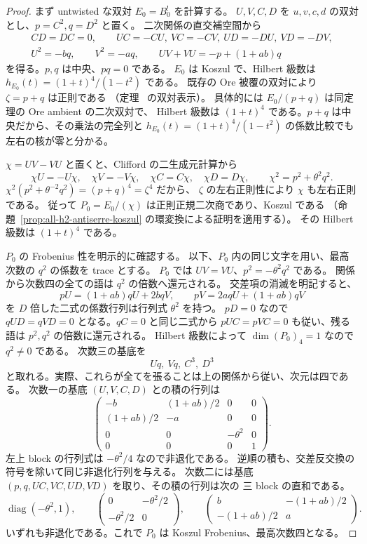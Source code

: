 \begin{proof}
まず untwisted な双対 \(E_0=B_0^!\) を計算する。
\(U,V,C,D\) を \(u,v,c,d\) の双対とし、\(p=C^2,q=D^2\) と置く。
二次関係の直交補空間から
\begin{gather*}
 CD=DC=0,\qquad
 UC=-CU,\ VC=-CV,\ UD=-DU,\ VD=-DV,\\
 U^2=-bq,\qquad V^2=-aq,\qquad
 UV+VU=-p+(1+ab)q
\end{gather*}
を得る。\(p,q\) は中央、\(pq=0\) である。
\(E_0\) は Koszul で、Hilbert 級数は
\(h_{E_0}(t)=(1+t)^4/(1-t^2)\) である。
既存の Ore 被覆の双対により \(\zeta=p+q\) は正則である
（定理~\cite[\texttt{thm:ore-anticommuting-central}]{QuadricIntrinsic2026} の双対表示）。
具体的には $E_0/(p+q)$ は同定理の Ore ambient の二次双対で、
Hilbert 級数は $(1+t)^4$ である。$p+q$ は中央だから、その乗法の完全列と
$h_{E_0}(t)=(1+t)^4/(1-t^2)$ の係数比較でも左右の核が零と分かる。

\(\chi=UV-VU\) と置くと、Clifford の二生成元計算から
\[
 \chi U=-U\chi,\quad \chi V=-V\chi,\quad
 \chi C=C\chi,\quad \chi D=D\chi,\qquad
 \chi^2=p^2+\theta^2q^2.
\]
\(\chi^2(p^2+\theta^{-2}q^2)=(p+q)^4=\zeta^4\) だから、
\(\zeta\) の左右正則性により \(\chi\) も左右正則である。
従って \(P_0=E_0/(\chi)\) は正則正規二次商であり、Koszul である
（命題~\ref{prop:all-h2-antiserre-koszul} の環変換による証明を適用する）。
その Hilbert 級数は \((1+t)^4\) である。

\(P_0\) の Frobenius 性を明示的に確認する。
以下、\(P_0\) 内の同じ文字を用い、最高次数の \(q^2\) の係数を trace とする。
\(P_0\) では \(UV=VU\)、\(p^2=-\theta^2q^2\) である。
関係から次数四の全ての語は \(q^2\) の倍数へ還元される。
交差項の消滅を明記すると、
\[
 pU=(1+ab)qU+2bqV,\qquad pV=2aqU+(1+ab)qV
\]
を $D$ 倍した二式の係数行列は行列式 $\theta^2$ を持つ。
$pD=0$ なので $qUD=qVD=0$ となる。$qC=0$ と同じ二式から
$pUC=pVC=0$ も従い、残る語は $p^2,q^2$ の倍数に還元される。
Hilbert 級数によって \(\dim(P_0)_4=1\) なので \(q^2\ne0\) である。
次数三の基底を
\[
 Uq,\ Vq,\ C^3,\ D^3
\]
と取れる。実際、これらが全てを張ることは上の関係から従い、次元は四である。
次数一の基底 \((U,V,C,D)\) との積の行列は
\[
 \begin{pmatrix}
 -b&(1+ab)/2&0&0\\
 (1+ab)/2&-a&0&0\\
 0&0&-\theta^2&0\\
 0&0&0&1
 \end{pmatrix}.
\]
左上 block の行列式は \(-\theta^2/4\) なので非退化である。
逆順の積も、交差反交換の符号を除いて同じ非退化行列を与える。
次数二には基底 \((p,q,UC,VC,UD,VD)\) を取り、その積の行列は次の
三 block の直和である。
\[
 \operatorname{diag}(-\theta^2,1),\qquad
 \begin{pmatrix}0&-\theta^2/2\\-\theta^2/2&0\end{pmatrix},\qquad
 \begin{pmatrix}b&-(1+ab)/2\\-(1+ab)/2&a\end{pmatrix}.
\]
いずれも非退化である。これで \(P_0\) は Koszul Frobenius、最高次数四となる。


\end{proof}
